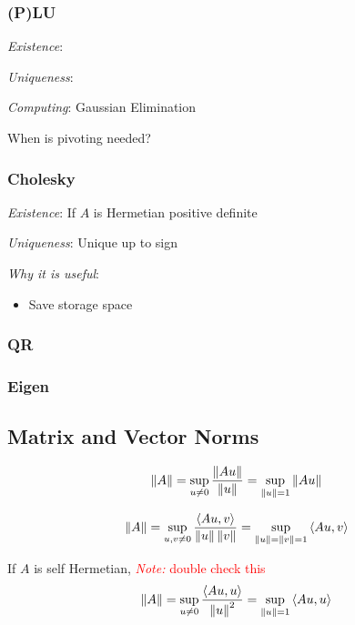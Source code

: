 \documentclass[12pt]{article}
\newcommand{\note}[1]{\textcolor{red}{\textit{Note:} #1}}
\begin{document}
\subsubsection{(P)LU}

\textit{Existence}:

\textit{Uniqueness}:

\textit{Computing}:
Gaussian Elimination 

When is pivoting needed?



\subsubsection{Cholesky}
\label{sec:cholesky}
\textit{Existence}: If \( A \) is Hermetian positive definite

\textit{Uniqueness}: Unique up to sign

\textit{Why it is useful}:
\begin{itemize}[nolistsep]
    \item Save storage space
\end{itemize}

\subsubsection{QR}


\subsubsection{Eigen}


\subsection{Matrix and Vector Norms}

\begin{align*}
    \left\lVert A\right\rVert = \sup_{u\neq 0} \frac{\left\lVert Au\right\rVert}{\left\lVert u\right\rVert} = \sup_{\left\lVert u\right\rVert=1} \left\lVert Au\right\rVert
\end{align*}

\begin{align*}
    \left\lVert A\right\rVert = \sup_{u,v\neq 0} \frac{\left\langle Au,v \right\rangle}{\left\lVert u\right\rVert\left\lVert v\right\rVert} = \sup_{\left\lVert u\right\rVert=\left\lVert v\right\rVert=1} \left\langle Au,v \right\rangle
\end{align*}
 
If \( A \) is self Hermetian,
\note{double check this}
\begin{align*}
    \left\lVert A\right\rVert = \sup_{u\neq 0} \frac{\left\langle Au,u \right\rangle}{\left\lVert u\right\rVert^2} = \sup_{\left\lVert u\right\rVert=1} \left\langle Au,u \right\rangle
\end{align*}
\end{document}
